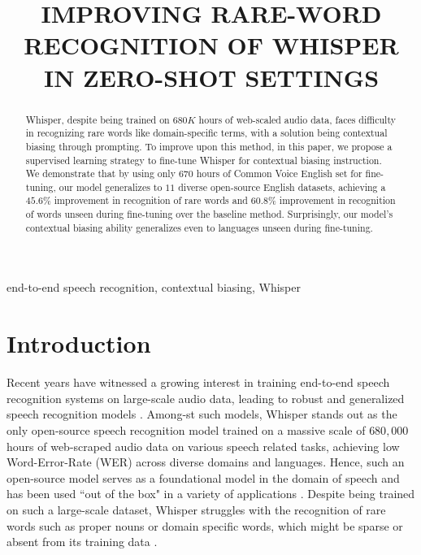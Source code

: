 \documentclass{article}
\title{IMPROVING RARE-WORD RECOGNITION OF WHISPER IN ZERO-SHOT SETTINGS}
\begin{document}
\maketitle
{\let\thefootnote\relax{}}

\begin{abstract}
Whisper, despite being trained on $680K$ hours of web-scaled audio data, faces difficulty in recognizing rare words like domain-specific terms, with a solution being contextual biasing through prompting. To improve upon this method, in this paper, we propose a supervised learning strategy to fine-tune Whisper for contextual biasing instruction. We demonstrate that by using only $670$ hours of Common Voice English set for fine-tuning, our model generalizes to $11$ diverse open-source English datasets, achieving a $45.6\%$ improvement in recognition of rare words and $60.8\%$ improvement in recognition of words unseen during fine-tuning over the baseline method. Surprisingly, our model's contextual biasing ability generalizes even to languages unseen during fine-tuning.

\end{abstract}

\begin{keywords}
end-to-end speech recognition, contextual biasing, Whisper
\end{keywords}

\section{Introduction}
\label{sec:intro}

Recent years have witnessed a growing interest in training end-to-end speech recognition systems on large-scale audio data, leading to robust and generalized speech recognition models \cite{wav2vec2,whisper}. Among-st such models, Whisper \cite{whisper} stands out as the only open-source speech recognition model trained on a massive scale of $680,000$ hours of web-scraped audio data on various speech related tasks, achieving low Word-Error-Rate (WER) across diverse domains and languages. Hence, such an open-source model serves as a foundational model in the domain of speech and has been used ``out of the box" in a variety of applications \cite{application, application2, application3}. Despite being trained on such a large-scale dataset, Whisper struggles with the recognition of rare words such as proper nouns or domain specific words, which might be sparse or absent from its training data \cite{tcpgen}.
\end{document}
